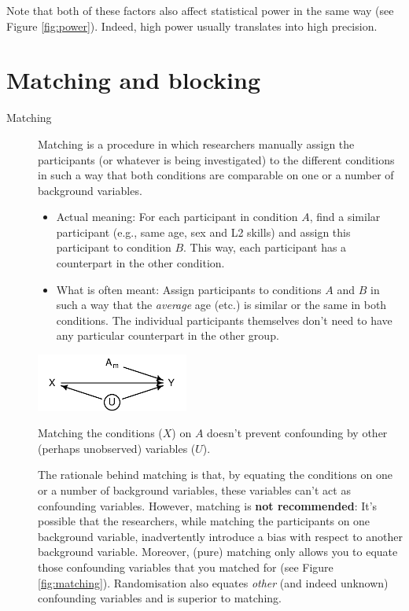 \documentclass[a4paper]{tufte-book}\usepackage[]{graphicx}\usepackage[]{xcolor}
\begin{document}
\medskip

Note that both of these factors also affect statistical power in the same
way (see Figure \vref{fig:power}).
Indeed, high power usually translates into high precision.

\section{Matching and blocking}\label{sec:blocking}

\begin{description}
 \item[Matching]
 Matching is a procedure in which researchers manually assign the participants
 (or whatever is being investigated) to the different conditions in such a way
 that both conditions are comparable on one or a number of background variables.

 \begin{itemize}
 \item Actual meaning: For each participant in condition $A$,
 find a similar participant (e.g., same age, sex and L2 skills)
 and assign this participant to condition $B$. This way, each participant
 has a counterpart in the other condition.

 \item What is often meant: Assign participants to conditions
 $A$ and $B$ in such a way that the \emph{average} age (etc.)
 is similar or the same in both conditions. The individual participants
 themselves don't need to have any particular counterpart in the other group.
 \end{itemize}
 
 \begin{marginfigure}[4cm]
\centering
\includegraphics[width = 5cm]{figure/matching}
\caption{Matching the conditions ($X$) on $A$ doesn't prevent confounding by other (perhaps unobserved) variables ($U$).}
\label{fig:matching}
\end{marginfigure}

 The rationale behind matching is that, by equating the conditions on one
 or a number of background variables, these variables can't act as confounding
 variables. However, matching is \textbf{not recommended}:
 It's possible that the researchers,
 while matching the participants on one background variable, inadvertently
 introduce a bias with respect to another background variable.
 Moreover, (pure) matching only allows you to equate those confounding variables
 that you matched for (see Figure \vref{fig:matching}).
 Randomisation also
 equates \emph{other} (and indeed unknown) confounding variables
 and is superior to matching.


\end{description}
\end{document}
